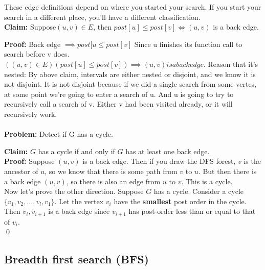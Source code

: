 \documentclass[12pt]{article}   	%
\begin{document}
\noindent
These edge definitions depend on where you started your search. If you start your search in a different place, you'll have a different classification.\\

\noindent
{\bf Claim:} Suppose$ (u,v) \in E$, then $post[u] \leq post[v] \iff (u,v)$ is a back edge.

\noindent
{\bf Proof:} Back edge $\implies post[u \leq post[v]$ Since u finishes its function call to search before v does.\\
$((u,v) \in E) (post[u] \leq post[v])\implies (u,v) is a back edge.$
Reason that it's nested: By above claim, intervals are either nested or disjoint, and we know it is not disjoint. It is not disjoint because if we did a single search from some vertes, at some point we're going to enter a search of u. And u is going to try to recursively call a search of v. Either v had been visited already, or it will recursively work.\\\\

{\bf Problem:} Detect if G has a cycle.

\noindent
{\bf Claim: }$G$ has a cycle if and only if $G$ has at least one back edge.\\

\noindent
{\bf Proof: }Suppose $(u,v)$ is a back edge. Then if you draw the DFS forest, $v$ is the ancestor of $u$, so we know that there is some path  from $v$ to $u$. But then there is a back edge $(u,v)$, so there is also an edge from $u$ to $v$. This is a cycle.\\

\noindent
Now let's prove the other direction. Suppose $G$ has a cycle. Consider a cycle $\{v_1,v_2,\ldots,v_l,v_1\}$. Let the vertex $v_i$ have the {\bf smallest} post order in the cycle. Then $v_i, v_{i+1}$ is a back edge since $v_{i+1}$ has post-order less than or equal to that of $v_i$.\\
\qed


\subsection{Breadth first search (BFS)}
\end{document}
